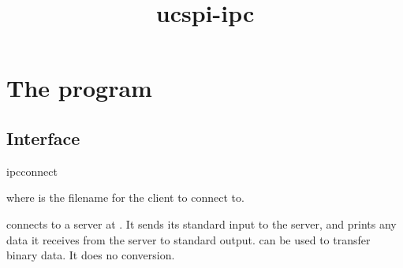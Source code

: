 \documentclass{book}
\title{ucspi-ipc}
\begin{document}
\section{The  program}

\subsection{Interface}
\begin{code}%
  ipcconnect 
\end{code}
where  is the filename for the client to connect to.

 connects to a server at .  It sends its
standard input to the server, and prints any data it receives from the
server to standard output.   can be used to transfer
binary data.  It does no conversion.
\end{document}
